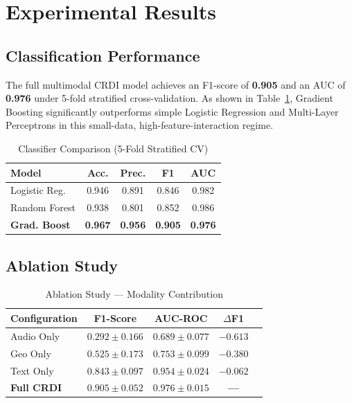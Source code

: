 \documentclass[conference]{IEEEtran}
\begin{document}
\section{Experimental Results}

\subsection{Classification Performance}

The full multimodal CRDI model achieves an F1-score of \textbf{0.905} and an AUC of \textbf{0.976} under 5-fold stratified cross-validation. As shown in Table~\ref{tab:classifiers}, Gradient Boosting significantly outperforms simple Logistic Regression and Multi-Layer Perceptrons in this small-data, high-feature-interaction regime.

\begin{table}[!t]
 \caption{Classifier Comparison (5-Fold Stratified CV)}
 \label{tab:classifiers}
 \centering
 \begin{tabular}{lcccc}
 \toprule
 \textbf{Model} & \textbf{Acc.} & \textbf{Prec.} & \textbf{F1} & \textbf{AUC} \\
 \midrule
 Logistic Reg. & 0.946 & 0.891 & 0.846 & 0.982 \\
 Random Forest & 0.938 & 0.801 & 0.852 & 0.986 \\
 \textbf{Grad. Boost} & \textbf{0.967} & \textbf{0.956} & \textbf{0.905} & \textbf{0.976} \\
 \bottomrule
 \end{tabular}
\end{table}

\subsection{Ablation Study}

\begin{table}[!t]
 \caption{Ablation Study --- Modality Contribution}
 \label{tab:ablation}
 \centering
 \begin{tabular}{lcccc}
 \toprule
 \textbf{Configuration} & \textbf{F1-Score} & \textbf{AUC-ROC} & \textbf{$\Delta$F1} \\
 \midrule
 Audio Only & $0.292 \pm 0.166$ & $0.689 \pm 0.077$ & $-0.613$ \\
 Geo Only   & $0.525 \pm 0.173$ & $0.753 \pm 0.099$ & $-0.380$ \\
 Text Only  & $0.843 \pm 0.097$ & $0.954 \pm 0.024$ & $-0.062$ \\
 \textbf{Full CRDI} & $\mathbf{0.905 \pm 0.052}$ & $\mathbf{0.976 \pm 0.015}$ & \textbf{---} \\
 \bottomrule
 \end{tabular}
\end{table}
\end{document}
